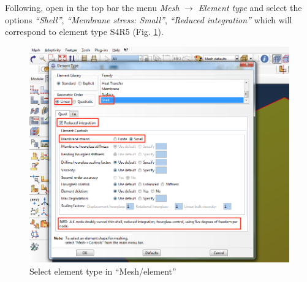 \documentclass[english,a4paper,12pt]{article}
\begin{document}
Following, open in the top bar the menu \emph{Mesh} $\to$ \emph{Element type} and select the options \emph{``Shell''}, \emph{``Membrane stress: Small''}, \emph{``Reduced integration''} which will correspond to element type S4R5 
(Fig. \ref{fig:mesh-element}).
\begin{figure}[h!tp]
\centering
\includegraphics[scale=0.33]{capturas/31-mesh.png}
\caption{Select element type in ``Mesh/element''}
\label{fig:mesh-element}%
\end{figure}
\end{document}
